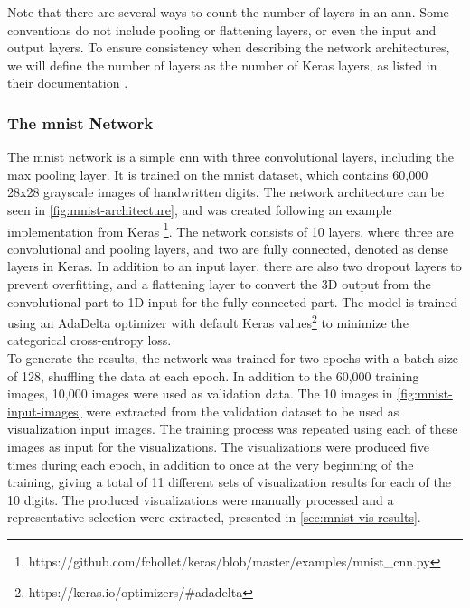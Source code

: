 \noindent Note that there are several ways to count the number of layers in an \acrshort{ann}. Some conventions do not include pooling or flattening layers, or even the input and output layers. To ensure consistency when describing the network architectures, we will define the number of layers as the number of Keras layers, as listed in their documentation \cite{keras-documentation}.

\subsubsection{The \acrshort{mnist} Network}

The \acrshort{mnist} network is a simple \acrshort{cnn} with three convolutional layers, including the max pooling layer. It is trained on the \acrshort{mnist} dataset, which contains 60,000 28x28 grayscale images of handwritten digits. The network architecture can be seen in \autoref{fig:mnist-architecture}, and was created following an example implementation from Keras \footnote{https://github.com/fchollet/keras/blob/master/examples/mnist\_cnn.py}. The network consists of 10 layers, where three are convolutional and pooling layers, and two are fully connected, denoted as dense layers in Keras. In addition to an input layer, there are also two dropout layers to prevent overfitting, and a flattening layer to convert the 3D output from the convolutional part to 1D input for the fully connected part. The model is trained using an AdaDelta optimizer with default Keras values\footnote{https://keras.io/optimizers/\#adadelta} to minimize the categorical cross-entropy loss. \\

\noindent To generate the results, the network was trained for two epochs with a batch size of 128, shuffling the data at each epoch. In addition to the 60,000 training images, 10,000 images were used as validation data. The 10 images in \autoref{fig:mnist-input-images} were extracted from the validation dataset to be used as visualization input images. The training process was repeated using each of these images as input for the visualizations. The visualizations were produced five times during each epoch, in addition to once at the very beginning of the training, giving a total of 11 different sets of visualization results for each of the 10 digits. The produced visualizations were manually processed and a representative selection were extracted, presented in \autoref{sec:mnist-vis-results}.


